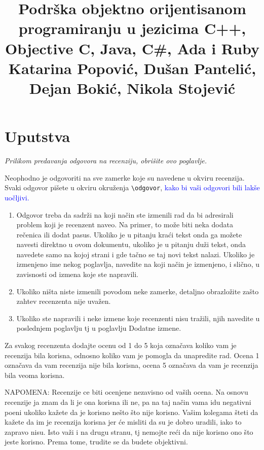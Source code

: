 \documentclass[a4paper]{report}
\newcommand{\odgovor}[1]{\textcolor{blue}{#1}}
\begin{document}
\title{ Podrška objektno orijentisanom programiranju u jezicima C++, Objective C, Java, C\#, Ada i Ruby\\ \small{Katarina Popović, Dušan Pantelić, Dejan Bokić, Nikola Stojević}}

\maketitle

\tableofcontents

\chapter{Uputstva}
\emph{Prilikom predavanja odgovora na recenziju, obrišite ovo poglavlje.}

Neophodno je odgovoriti na sve zamerke koje su navedene u okviru recenzija. Svaki odgovor pišete u okviru okruženja \verb"\odgovor", \odgovor{kako bi vaši odgovori bili lakše uočljivi.} 
\begin{enumerate}

\item Odgovor treba da sadrži na koji način ste izmenili rad da bi adresirali problem koji je recenzent naveo. Na primer, to može biti neka dodata rečenica ili dodat pasus. Ukoliko je u pitanju kraći tekst onda ga možete navesti direktno u ovom dokumentu, ukoliko je u pitanju duži tekst, onda navedete samo na kojoj strani i gde tačno se taj novi tekst nalazi. Ukoliko je izmenjeno ime nekog poglavlja, navedite na koji način je izmenjeno, i slično, u zavisnosti od izmena koje ste napravili. 

\item Ukoliko ništa niste izmenili povodom neke zamerke, detaljno obrazložite zašto zahtev recenzenta nije uvažen.

\item Ukoliko ste napravili i neke izmene koje recenzenti nisu tražili, njih navedite u poslednjem poglavlju tj u poglavlju Dodatne izmene.
\end{enumerate}

Za svakog recenzenta dodajte ocenu od 1 do 5 koja označava koliko vam je recenzija bila korisna, odnosno koliko vam je pomogla da unapredite rad. Ocena 1 označava da vam recenzija nije bila korisna, ocena 5 označava da vam je recenzija bila veoma korisna. 

NAPOMENA: Recenzije ce biti ocenjene nezavisno od vaših ocena. Na osnovu recenzije ja znam da li je ona korisna ili ne, pa na taj način vama idu negativni poeni ukoliko kažete da je korisno nešto što nije korisno. Vašim kolegama šteti da kažete da im je recenzija korisna jer će misliti da su je dobro uradili, iako to zapravo nisu. Isto važi i na drugu stranu, tj nemojte reći da nije korisno ono što jeste korisno. Prema tome, trudite se da budete objektivni. 
\end{document}
